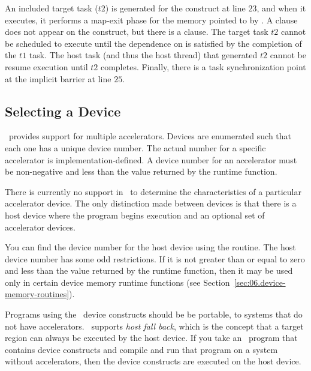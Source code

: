 An included target task ($t2$) is generated for the 
construct at line $23$, and when it executes, it performs a map-exit phase for
the memory pointed to by .  
A  clause does not appear on the construct, but there is a
 clause.  The target task $t2$ cannot be scheduled to execute until the dependence
on  is satisfied by the completion of the $t1$ task.  
The host task (and thus the host thread)
that generated $t2$ cannot be resume execution until $t2$ completes.
Finally, there is a task
synchronization point at the implicit barrier at line $25$.

\subsection{Selecting a Device}
\label{sec:06.which-device}

\OMP\ provides support for multiple accelerators.  Devices are
enumerated such that each one has a unique device number.  The actual number
for a specific accelerator is implementation-defined.  A device number
for an accelerator must be non-negative and less than the value
returned by the  runtime function.

There is currently no support in \OMP\ to determine the characteristics of a
particular accelerator device.  The only distinction made between devices is
that there is a host device where the program begins execution and an optional
set of accelerator devices.

You can find the device number for the host device using the
 routine.  The host device number has some odd
restrictions.  If it is not greater than or equal to zero and less than the
value returned by the  runtime function, then it may
be used only in certain device memory runtime functions (see
Section~\ref{sec:06.device-memory-routines}).

Programs using the \OMP\ device constructs should be be portable,
to systems that do not have accelerators.  \OMP\ supports \emph{host
fall back}, which is the concept that a target region can always be executed by
the host device.  If you take an \OMP\ program that contains device constructs
and compile and run that program on a system without accelerators, then the
device constructs are executed on the host device.

